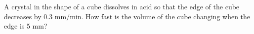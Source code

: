 \begin{multicols}{2}
\problem A crystal in the shape of a cube dissolves in acid so that the edge of
the cube decreases by 0.3 mm/min. How fast is the volume of the cube changing
when the edge is 5 mm?


\end{multicols}



\noproblemfont


